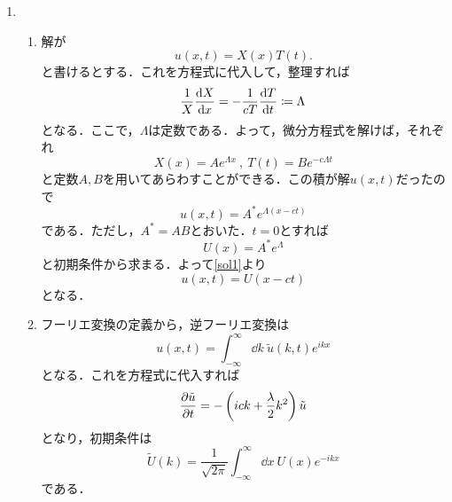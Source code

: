 \documentclass[a4paper,pdflatex,ja=standard]{bxjsarticle}
\begin{document}
\begin{enumerate}
  \item 
  \begin{enumerate}
    \item 
    解が
    \begin{equation}
      u(x,t)
      =
      X(x)T(t)
      .
    \end{equation}
    と書けるとする．これを方程式に代入して，整理すれば
    \begin{equation}
      \frac{1}{X}\dv{X}{x}
      =
      -\frac{1}{cT}\dv{T}{t}
      \coloneqq
      \Lambda
    \end{equation}
    となる．ここで，$\Lambda$は定数である．よって，微分方程式を解けば，それぞれ
    \begin{equation}
      X(x)=Ae^{\Lambda x}\ ,\ T(t)=Be^{-c\Lambda t}
    \end{equation}
    と定数$A,B$を用いてあらわすことができる．この積が解$u(x,t)$だったので
    \begin{equation}
      u(x,t)
      =
      A^{*}e^{\Lambda (x-ct)}
      \label{sol1}
    \end{equation}
    である．ただし，$A^{*}=AB$とおいた．$t=0$とすれば
    \begin{equation}
      U(x)
      =
      A^{*}e^{\Lambda }
    \end{equation}
    と初期条件から求まる．よって\eqref{sol1}より
    \begin{equation}
      u(x,t)=U(x-ct)
    \end{equation}
    となる．

    \item 
    フーリエ変換の定義から，逆フーリエ変換は
    \begin{equation}
      u(x,t)
      =
      \int_{-\infty}^{\infty}\dd k\ \tilde{u}(k,t)e^{ikx}
    \end{equation}
    となる．これを方程式に代入すれば
    \begin{equation}
      \pdv{\tilde{u}}{t}
      =
      -\left( ick+\frac{\lambda}{2}k^2 \right)\tilde{u}
      \label{PDEink}
    \end{equation}
    となり，初期条件は
    \begin{equation}
      \tilde{U}(k)
      =
      \frac{1}{\sqrt{2\pi}}\int_{-\infty}^{\infty}\dd x\ U(x)e^{-ikx}
    \end{equation}
    である．


\end{enumerate}
\end{enumerate}
\end{document}
